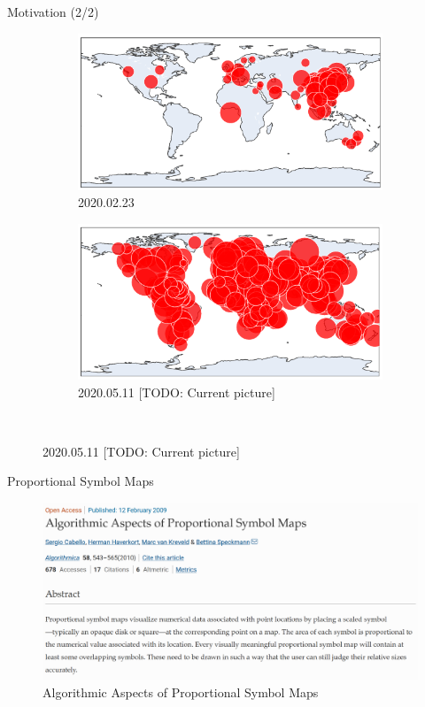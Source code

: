 \documentclass{beamer}
\begin{document}
\begin{frame}{Motivation (2/2)}

  \begin{figure}[!b]
    \centering
    \begin{subfigure}[b]{\linewidth}
      \centering
      \includegraphics[width=0.5\linewidth]{../covid_spread_20200223.png}
      \caption{2020.02.23}
    \end{subfigure}
    \begin{subfigure}[b]{\linewidth}
      \centering
      \includegraphics[width=0.5\linewidth]{../covid_spread_20200511.png}
      \caption{2020.05.11 [TODO: Current picture]}
    \end{subfigure}\\
  \end{figure}

\end{frame}

\begin{frame}{Proportional Symbol Maps}

  \begin{figure}[!b]
    \centering
      \includegraphics[width=0.9\linewidth]{assets/cabello_haverkort_image.png}
      \caption{Algorithmic Aspects of Proportional Symbol Maps}
  \end{figure}

\end{frame}
\end{document}
